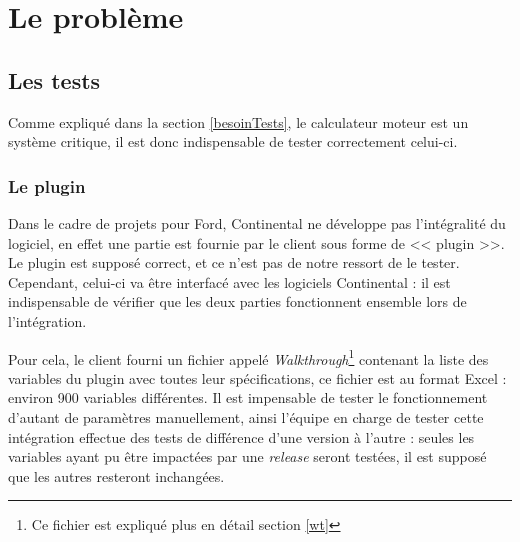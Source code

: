 \chapter{Le problème} \label{chapPb}
	\section{Les tests} \label{pbTests}
	Comme expliqué dans la section \ref{besoinTests}, le calculateur moteur est un système critique, il est donc indispensable de tester correctement celui-ci.

	\subsection{Le plugin}
	Dans le cadre de projets pour Ford, Continental ne développe pas l'intégralité du logiciel, en effet une partie est fournie par le client sous forme de << plugin >>. Le plugin est supposé correct, et ce n'est pas de notre ressort de le tester. Cependant, celui-ci va être interfacé avec les logiciels Continental : il est indispensable de vérifier que les deux parties fonctionnent ensemble lors de l'intégration.

	Pour cela, le client fourni un fichier appelé \textit{Walkthrough}\footnote{Ce fichier est expliqué plus en détail section \ref{wt}} contenant la liste des variables du plugin avec toutes leur spécifications, ce fichier est au format Excel : environ 900 variables différentes. Il est impensable de tester le fonctionnement d'autant de paramètres manuellement, ainsi l'équipe en charge de tester cette intégration effectue des tests de différence d'une version à l'autre : seules les variables ayant pu être impactées par une \textit{release} seront testées, il est supposé que les autres resteront inchangées.

